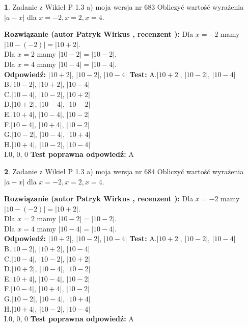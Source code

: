 \documentclass[12pt, a4paper]{article}
\theoremstyle{definition} %
\newtheorem{zad}{}
\newcommand{\zadStart}[1]{\begin{zad}#1\newline}
\newcommand{\zadStop}{\end{zad}}
\newcommand{\rozwStart}[2]{\noindent \textbf{Rozwiązanie (autor #1 , recenzent #2): }\newline}
\newcommand{\rozwStop}{\newline}
\newcommand{\odpStart}{\noindent \textbf{Odpowiedź:}\newline}
\newcommand{\odpStop}{\newline}
\newcommand{\testStart}{\noindent \textbf{Test:}\newline}
\newcommand{\testStop}{\newline}
\newcommand{\kluczStart}{\noindent \textbf{Test poprawna odpowiedź:}\newline}
\newcommand{\kluczStop}{\newline}
\begin{document}
\zadStart{Zadanie z Wikieł P 1.3 a) moja wersja nr 683}
Obliczyć wartość wyrażenia $|a - x|$ dla $x=-2,x=2,x=4$.
\zadStop
\rozwStart{Patryk Wirkus}{}
Dla $x = -2$ mamy $|10 - (-2)| = |10 + 2|$.\\
Dla $x = 2$ mamy $|10 - 2| = |10 - 2|$.\\
Dla $x = 4$ mamy $|10 - 4| = |10 - 4|$.\\
\rozwStop
\odpStart
$|10 + 2|$, $|10 - 2|$, $|10 - 4|$
\odpStop
\testStart
A.$|10 + 2|$, $|10 - 2|$, $|10 - 4|$\\
B.$|10 - 2|$, $|10 + 2|$, $|10 - 4|$\\
C.$|10 - 4|$, $|10 - 2|$, $|10 + 2|$\\
D.$|10 + 2|$, $|10 - 4|$, $|10 - 2|$\\
E.$|10 + 4|$, $|10 - 4|$, $|10 - 2|$\\
F.$|10 - 4|$, $|10 + 4|$, $|10 - 2|$\\
G.$|10 - 2|$, $|10 - 4|$, $|10 + 4|$\\
H.$|10 + 4|$, $|10 - 2|$, $|10 - 4|$\\
I.$0$, $0$, $0$
\testStop
\kluczStart
A
\kluczStop



\zadStart{Zadanie z Wikieł P 1.3 a) moja wersja nr 684}
Obliczyć wartość wyrażenia $|a - x|$ dla $x=-2,x=2,x=4$.
\zadStop
\rozwStart{Patryk Wirkus}{}
Dla $x = -2$ mamy $|10 - (-2)| = |10 + 2|$.\\
Dla $x = 2$ mamy $|10 - 2| = |10 - 2|$.\\
Dla $x = 4$ mamy $|10 - 4| = |10 - 4|$.\\
\rozwStop
\odpStart
$|10 + 2|$, $|10 - 2|$, $|10 - 4|$
\odpStop
\testStart
A.$|10 + 2|$, $|10 - 2|$, $|10 - 4|$\\
B.$|10 - 2|$, $|10 + 2|$, $|10 - 4|$\\
C.$|10 - 4|$, $|10 - 2|$, $|10 + 2|$\\
D.$|10 + 2|$, $|10 - 4|$, $|10 - 2|$\\
E.$|10 + 4|$, $|10 - 4|$, $|10 - 2|$\\
F.$|10 - 4|$, $|10 + 4|$, $|10 - 2|$\\
G.$|10 - 2|$, $|10 - 4|$, $|10 + 4|$\\
H.$|10 + 4|$, $|10 - 2|$, $|10 - 4|$\\
I.$0$, $0$, $0$
\testStop
\kluczStart
A
\kluczStop
\end{document}
